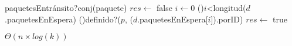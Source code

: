 \begin{Algoritmos}
  \begin{algoritmo}{paquetesEntr\'{a}nsito?}{}{conj(paquete)}
    $res \gets$ false 
     $i \gets 0$
    \While(){$i$<longitud($d$.paquetesEnEspera)}{
      \If(){definido?($p$, ($d$.paquetesEnEspera[$i$]).porID)}{
          $res \gets$ true
      }
    }
  \end{algoritmo}
  \datosAlgoritmo{} %
  {} %
  {} %
  {$\Theta(n \times log(k))$} %
  {} %

\end{Algoritmos}

